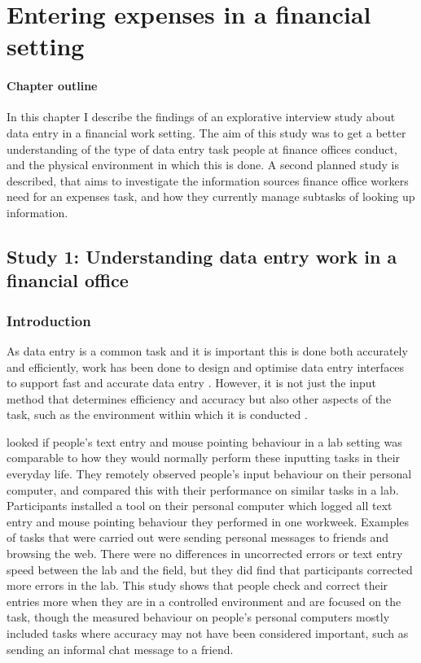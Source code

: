 \documentclass[11pt,oneside]{report}
\begin{document}
\chapter{Entering expenses in a financial setting}\label{ch:Study1}
\begin{mynote}
\subsubsection{Chapter outline}

In this chapter I describe the findings of an explorative interview study about data entry in a financial work setting. The aim of this study was to get a better understanding of the type of data entry task people at finance offices conduct, and the physical environment in which this is done.
A second planned study is described, that aims to investigate the information sources finance office workers need for an expenses task, and how they currently manage subtasks of looking up information.

\end{mynote}

\section{Study 1: Understanding data entry work in a financial office}\label{ch:Study1}
 
\subsection{Introduction}
As data entry is a common task and it is important this is done both accurately and efficiently, work has been done to design and optimise data entry interfaces to support fast and accurate data entry \citep[e.g.][]{Oladimeji2013, Vertanen2015, Wiseman2013a}.
However, it is not just the input method that determines efficiency and accuracy but also other aspects of the task, such as the environment within which it is conducted \citep{Payne2013, Randall2014}.

\citet{Evans2012} looked if people's text entry and mouse pointing behaviour in a lab setting was comparable to how they would normally perform these inputting tasks in their everyday life. They remotely observed people's input behaviour on their personal computer, and compared this with their performance on similar tasks in a lab. Participants installed a tool on their personal computer which logged all text entry and mouse pointing behaviour they performed in one workweek. Examples of tasks that were carried out were sending personal messages to friends and browsing the web. There were no differences in uncorrected errors or text entry speed between the lab and the field, but they did find that participants corrected more errors in the lab. This study shows that people check and correct their entries more when they are in a controlled environment and are focused on the task, though the measured behaviour on people's personal computers mostly included tasks where accuracy may not have been considered important, such as sending an informal chat message to a friend. 
\end{document}
